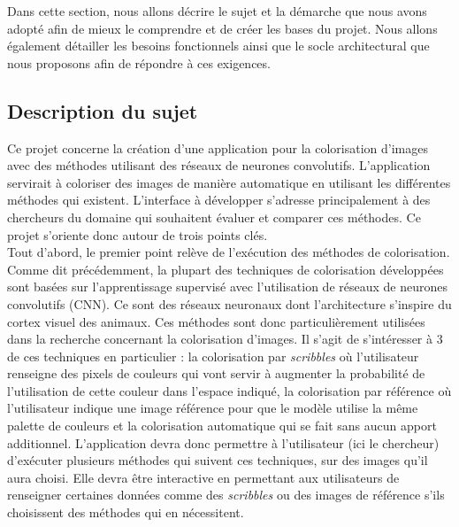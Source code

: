 \documentclass{article}
\begin{document}
Dans cette section, nous allons décrire le sujet et la démarche que nous avons adopté afin de mieux le comprendre et de
créer les bases du projet. 
Nous allons également détailler les besoins fonctionnels ainsi que le socle architectural que nous proposons afin de 
répondre à ces exigences.

\subsection{Description du sujet}

Ce projet concerne la création d'une application pour la colorisation d'images avec des méthodes utilisant des réseaux de neurones convolutifs.
L'application servirait à coloriser des images de manière automatique en utilisant les différentes méthodes qui existent. L'interface à développer s'adresse principalement à des chercheurs du domaine qui souhaitent évaluer et comparer ces méthodes.
Ce projet s'oriente donc autour de trois points clés.
\\

Tout d'abord, le premier point relève de l'exécution des méthodes de colorisation.
Comme dit précédemment, la plupart des techniques de colorisation développées sont basées sur l’apprentissage supervisé avec l’utilisation de réseaux de neurones convolutifs (CNN). Ce sont des 
réseaux neuronaux dont l'architecture s'inspire du cortex visuel des animaux. Ces méthodes sont donc particulièrement utilisées dans la recherche concernant la colorisation d'images.
Il s'agit de s'intéresser à 3 de ces techniques en particulier : la colorisation par \textit{scribbles} où l’utilisateur renseigne des pixels de couleurs qui vont servir à augmenter la probabilité de l’utilisation de cette couleur dans l’espace indiqué, 
la colorisation par référence où l’utilisateur indique une image référence pour que le modèle utilise la même palette de couleurs et 
la colorisation automatique qui se fait sans aucun apport additionnel.
L'application devra donc permettre à l'utilisateur (ici le chercheur) d'exécuter plusieurs méthodes qui suivent ces techniques, sur des images qu'il aura choisi.
Elle devra être interactive en permettant aux utilisateurs de renseigner certaines données comme des \textit{scribbles} ou des images de référence
s'ils choisissent des méthodes qui en nécessitent.
\\
\end{document}
